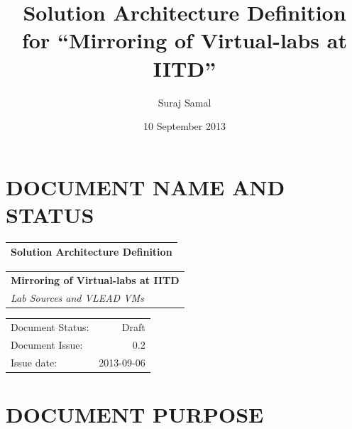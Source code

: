 \documentclass[11pt]{article}
\title{Solution Architecture Definition for ``Mirroring of Virtual-labs at IITD''}
\author{Suraj Samal}
\date{10 September 2013}
\begin{document}
\maketitle

\setcounter{tocdepth}{3}
\tableofcontents
\vspace*{1cm}

\listoftables
\listoffigures

\section{DOCUMENT NAME AND STATUS}
\label{sec-1}




\begin{center}
\begin{tabular}{l}
\hline
 Solution Architecture Definition  \\
\hline
\end{tabular}
\end{center}




\begin{center}
\begin{tabular}{l}
\hline
 \textbf{Mirroring of Virtual-labs at IITD}  \\
 \emph{Lab Sources and VLEAD VMs}            \\
\hline
\end{tabular}
\end{center}




\begin{center}
\begin{tabular}{lr}
\hline
 Document Status:  &       Draft  \\
 Document Issue:   &         0.2  \\
 Issue date:       &  2013-09-06  \\
\hline
\end{tabular}
\end{center}


                                      
\section{DOCUMENT PURPOSE}
\label{sec-2}
\end{document}
